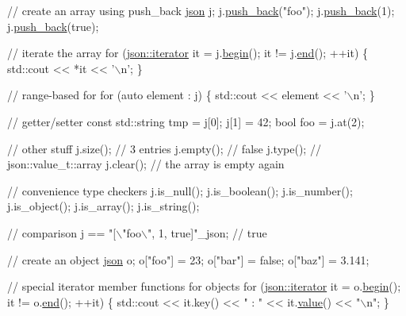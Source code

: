 \begin{DoxyCode}
\textcolor{comment}{// create an array using push\_back}
\hyperlink{a00025}{json} j;
j.\hyperlink{a00025_a486b96adbf4886c38e38c952394a220f}{push\_back}(\textcolor{stringliteral}{"foo"});
j.\hyperlink{a00025_a486b96adbf4886c38e38c952394a220f}{push\_back}(1);
j.\hyperlink{a00025_a486b96adbf4886c38e38c952394a220f}{push\_back}(\textcolor{keyword}{true});

\textcolor{comment}{// iterate the array}
\textcolor{keywordflow}{for} (\hyperlink{a00079}{json::iterator} it = j.\hyperlink{a00025_ad4e381c54039607be08d7af41a1f6ad1}{begin}(); it != j.\hyperlink{a00025_a12ccf14d39ddae52f6c7e126105a230b}{end}(); ++it) \{
  std::cout << *it << \textcolor{charliteral}{'\(\backslash\)n'};
\}

\textcolor{comment}{// range-based for}
\textcolor{keywordflow}{for} (\textcolor{keyword}{auto} element : j) \{
  std::cout << element << \textcolor{charliteral}{'\(\backslash\)n'};
\}

\textcolor{comment}{// getter/setter}
\textcolor{keyword}{const} std::string tmp = j[0];
j[1] = 42;
\textcolor{keywordtype}{bool} foo = j.at(2);

\textcolor{comment}{// other stuff}
j.size();     \textcolor{comment}{// 3 entries}
j.empty();    \textcolor{comment}{// false}
j.type();     \textcolor{comment}{// json::value\_t::array}
j.clear();    \textcolor{comment}{// the array is empty again}

\textcolor{comment}{// convenience type checkers}
j.is\_null();
j.is\_boolean();
j.is\_number();
j.is\_object();
j.is\_array();
j.is\_string();

\textcolor{comment}{// comparison}
j == \textcolor{stringliteral}{"[\(\backslash\)"foo\(\backslash\)", 1, true]"}\_json;  \textcolor{comment}{// true}

\textcolor{comment}{// create an object}
\hyperlink{a00025}{json} o;
o[\textcolor{stringliteral}{"foo"}] = 23;
o[\textcolor{stringliteral}{"bar"}] = \textcolor{keyword}{false};
o[\textcolor{stringliteral}{"baz"}] = 3.141;

\textcolor{comment}{// special iterator member functions for objects}
\textcolor{keywordflow}{for} (\hyperlink{a00079}{json::iterator} it = o.\hyperlink{a00025_ad4e381c54039607be08d7af41a1f6ad1}{begin}(); it != o.\hyperlink{a00025_a12ccf14d39ddae52f6c7e126105a230b}{end}(); ++it) \{
  std::cout << it.key() << \textcolor{stringliteral}{" : "} << it.\hyperlink{a00025_a0a2cbbd95862a623e7dc5c37e67dead0}{value}() << \textcolor{stringliteral}{"\(\backslash\)n"};
\}


\end{DoxyCode}
